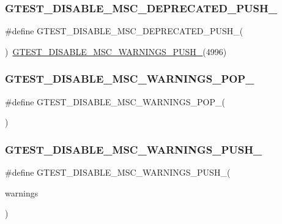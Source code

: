 \subsubsection{\texorpdfstring{GTEST\_DISABLE\_MSC\_DEPRECATED\_PUSH\_}{GTEST\_DISABLE\_MSC\_DEPRECATED\_PUSH\_}}
{\footnotesize\ttfamily \#define G\+T\+E\+S\+T\+\_\+\+D\+I\+S\+A\+B\+L\+E\+\_\+\+M\+S\+C\+\_\+\+D\+E\+P\+R\+E\+C\+A\+T\+E\+D\+\_\+\+P\+U\+S\+H\+\_\+(\begin{DoxyParamCaption}{ }\end{DoxyParamCaption})~\mbox{\hyperlink{_obj__test_2lib_2googletest-release-1_88_81_2googletest_2src_2gtest-internal-inl_8h_a88f79832f9d045112a76e9da8611cc13}{G\+T\+E\+S\+T\+\_\+\+D\+I\+S\+A\+B\+L\+E\+\_\+\+M\+S\+C\+\_\+\+W\+A\+R\+N\+I\+N\+G\+S\+\_\+\+P\+U\+S\+H\+\_\+}}(4996)}

\mbox{\label{googletest-master_2googletest_2include_2gtest_2internal_2gtest-port_8h_ab4c44546d6d9aced68993b87b608fc06}} 
\subsubsection{\texorpdfstring{GTEST\_DISABLE\_MSC\_WARNINGS\_POP\_}{GTEST\_DISABLE\_MSC\_WARNINGS\_POP\_}}
{\footnotesize\ttfamily \#define G\+T\+E\+S\+T\+\_\+\+D\+I\+S\+A\+B\+L\+E\+\_\+\+M\+S\+C\+\_\+\+W\+A\+R\+N\+I\+N\+G\+S\+\_\+\+P\+O\+P\+\_\+(\begin{DoxyParamCaption}{ }\end{DoxyParamCaption})}

\mbox{\label{googletest-master_2googletest_2include_2gtest_2internal_2gtest-port_8h_a86994cc68e844d8b82089c70408dfc61}} 
\subsubsection{\texorpdfstring{GTEST\_DISABLE\_MSC\_WARNINGS\_PUSH\_}{GTEST\_DISABLE\_MSC\_WARNINGS\_PUSH\_}}
{\footnotesize\ttfamily \#define G\+T\+E\+S\+T\+\_\+\+D\+I\+S\+A\+B\+L\+E\+\_\+\+M\+S\+C\+\_\+\+W\+A\+R\+N\+I\+N\+G\+S\+\_\+\+P\+U\+S\+H\+\_\+(\begin{DoxyParamCaption}\item[{}]{warnings }\end{DoxyParamCaption})}

